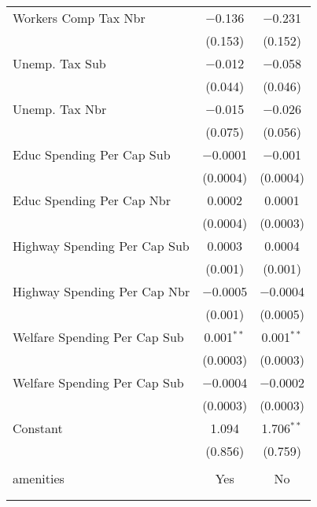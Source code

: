\begin{table}[!htbp]
\begin{tabular}{@{\extracolsep{5pt}}lcc}
  Workers Comp Tax Nbr & $-$0.136 & $-$0.231 \\ 
  & (0.153) & (0.152) \\ 
  Unemp. Tax Sub & $-$0.012 & $-$0.058 \\ 
  & (0.044) & (0.046) \\ 
  Unemp. Tax Nbr & $-$0.015 & $-$0.026 \\ 
  & (0.075) & (0.056) \\ 
  Educ Spending Per Cap Sub & $-$0.0001 & $-$0.001 \\ 
  & (0.0004) & (0.0004) \\ 
  Educ Spending Per Cap Nbr & 0.0002 & 0.0001 \\ 
  & (0.0004) & (0.0003) \\ 
  Highway Spending Per Cap Sub & 0.0003 & 0.0004 \\ 
  & (0.001) & (0.001) \\ 
  Highway Spending Per Cap Nbr & $-$0.0005 & $-$0.0004 \\ 
  & (0.001) & (0.0005) \\ 
  Welfare Spending Per Cap Sub & 0.001$^{**}$ & 0.001$^{**}$ \\ 
  & (0.0003) & (0.0003) \\ 
  Welfare Spending Per Cap Sub & $-$0.0004 & $-$0.0002 \\ 
  & (0.0003) & (0.0003) \\ 
  Constant & 1.094 & 1.706$^{**}$ \\ 
  & (0.856) & (0.759) \\ 
 \hline \\[-1.8ex] 
amenities & Yes & No \\ 
\hline \\[-1.8ex] 
\hline 
\hline \\[-1.8ex] 
\end{tabular} 
\end{table} 
